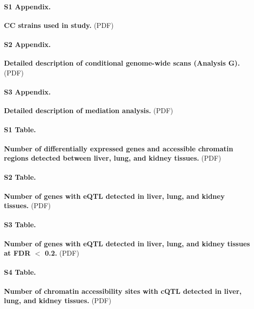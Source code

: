 \documentclass[10pt,letterpaper]{article}
\begin{document}

\paragraph*{S1 Appendix.}
\label{S1_Appendix}
{\bf CC strains used in study.} 
(PDF)

\paragraph*{S2 Appendix.}
\label{S2_Appendix}
{\bf Detailed description of conditional genome-wide scans (Analysis G).}
(PDF)

\paragraph*{S3 Appendix.}
\label{S3_Appendix}
{\bf Detailed description of mediation analysis.}
(PDF)

\paragraph*{S1 Table.}
\label{S_de}
{\bf Number of differentially expressed genes and accessible chromatin regions detected between liver, lung, and kidney tissues.} 
(PDF)

\paragraph*{S2 Table.}
\label{S_eqtl}
{\bf Number of genes with eQTL detected in liver, lung, and kidney tissues.} 
(PDF)

\paragraph*{S3 Table.}
\label{S_eqtl_lenient}
{\bf Number of genes with eQTL detected in liver, lung, and kidney tissues at FDR $<$ 0.2.} 
(PDF)

\paragraph*{S4 Table.}
\label{S_cqtl}
{\bf Number of chromatin accessibility sites with cQTL detected in liver, lung, and kidney tissues.} 
(PDF)
\end{document}
